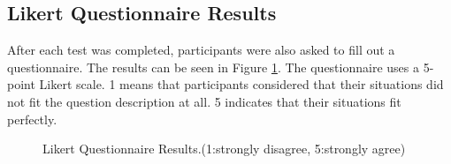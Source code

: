 \subsection{Likert Questionnaire Results}
After each test was completed, participants were also asked to fill out a questionnaire. The results can be seen in Figure \ref{fig:liker}. The questionnaire uses a 5-point Likert scale. 1 means that participants considered that their situations did not fit the question description at all. 5 indicates that their situations fit perfectly.
\begin{figure}[htbp]
    \centering
    \caption{Likert Questionnaire Results.(1:strongly disagree, 5:strongly agree)}
    \label{fig:liker} 
\end{figure}



